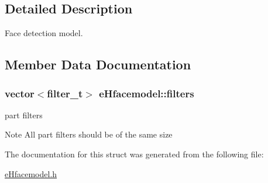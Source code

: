 \subsection{Detailed Description}
Face detection model. 

\subsection{Member Data Documentation}
\hypertarget{structeHfacemodel_a123d519573ca06cd4eba441997206e38}{
\subsubsection[{filters}]{\setlength{\rightskip}{0pt plus 5cm}vector$<${\bf filter\-\_\-t}$>$ e\-Hfacemodel\-::filters}}\label{structeHfacemodel_a123d519573ca06cd4eba441997206e38}


part filters 

\begin{DoxyNote}{Note}
All part filters should be of the same size 
\end{DoxyNote}


The documentation for this struct was generated from the following file\-:\begin{DoxyCompactItemize}
\item 
\hyperlink{eHfacemodel_8h}{e\-Hfacemodel.\-h}\end{DoxyCompactItemize}
